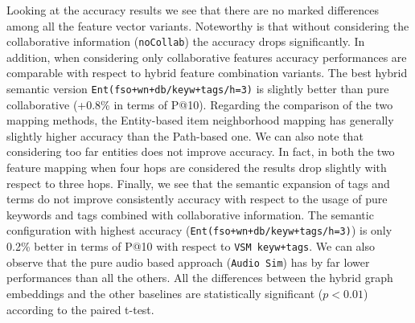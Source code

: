 Looking at the accuracy results we see that there are no marked differences among all the feature vector variants. Noteworthy is that without considering the collaborative information (\texttt{noCollab}) the accuracy drops significantly. In addition, when considering only collaborative features accuracy performances are comparable with respect to hybrid feature combination variants. The best hybrid semantic version \texttt{Ent(fso+wn+db/keyw+tags/h=3)} is slightly better than pure collaborative (+0.8\% in terms of P@10). 
Regarding the comparison of the two mapping methods, the Entity-based item neighborhood mapping has generally slightly higher accuracy than the Path-based one. We can also note that considering too far entities does not improve accuracy. In fact, in both the two feature mapping when four hops are considered the results drop slightly with respect to three hops. 
Finally, we see that the semantic expansion of tags and terms do not improve consistently accuracy with respect to the usage of pure keywords and tags combined with collaborative information. The semantic configuration with highest accuracy (\texttt{Ent(fso+wn+db/keyw+tags/h=3)}) is only 0.2\% better in terms of P@10 with respect to  \texttt{VSM keyw+tags}. We can also observe that the pure audio based approach (\texttt{Audio Sim}) has by far lower performances than all the others. All the differences between the hybrid graph embeddings and the other baselines are statistically significant ($p<0.01$) according to the paired t-test.

